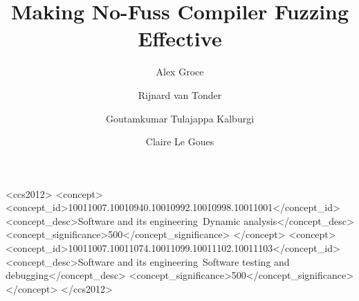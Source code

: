 \documentclass[sigplan,screen]{acmart}
\begin{document}
\lstset{style=gostyle}

\title{Making No-Fuss Compiler Fuzzing Effective}






\newcommand{\mr}[2]{\multirow{#1}{*}{#2}}
\newcommand{\mc}[3]{\multicolumn{#1}{#2}{#3}}

\newcommand{\clg}[1]{\textcolor{blue}{#1}}
\newcommand{\rvt}[1]{\textcolor{purple}{#1}}
\newcommand{\kj}[1]{\textcolor{olive}{#1}}

\author{Alex Groce}

\author{Rijnard van Tonder}

\author{Goutamkumar Tulajappa Kalburgi}

\author{Claire Le Goues}

\begin{abstract}

\end{abstract}

\begin{CCSXML}
<ccs2012>
<concept>
<concept_id>10011007.10010940.10010992.10010998.10011001</concept_id>
<concept_desc>Software and its engineering~Dynamic analysis</concept_desc>
<concept_significance>500</concept_significance>
</concept>
<concept>
<concept_id>10011007.10011074.10011099.10011102.10011103</concept_id>
<concept_desc>Software and its engineering~Software testing and debugging</concept_desc>
<concept_significance>500</concept_significance>
</concept>
</ccs2012>
\end{CCSXML}
\end{document}
